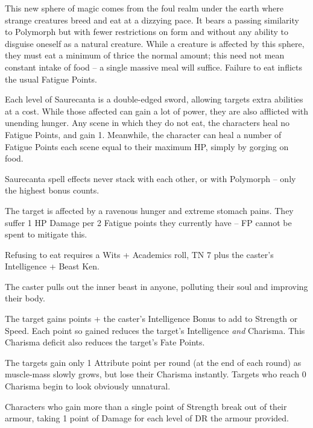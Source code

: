 \begin{multicols}{2}

\noindent
This new sphere of magic comes from the foul realm under the earth where strange creatures breed and eat at a dizzying pace.
It bears a passing similarity to Polymorph but with fewer restrictions on form and without any ability to disguise oneself as a natural creature.
While a creature is affected by this sphere, they must eat a minimum of thrice the normal amount; this need not mean constant intake of food -- a single massive meal will suffice.
Failure to eat inflicts the usual Fatigue Points.

Each level of Saurecanta is a double-edged sword, allowing targets extra abilities at a cost.
While those affected can gain a lot of power, they are also afflicted with unending hunger.
Any scene in which they do not eat, the characters heal no Fatigue Points, and gain 1.
Meanwhile, the character can heal a number of Fatigue Points each scene equal to their maximum HP, simply by gorging on food.

Saurecanta spell effects never stack with each other, or with Polymorph -- only the highest bonus counts.

\spelllevel \label{saurecantaone}
The target is affected by a ravenous hunger and extreme stomach pains.
They suffer 1 HP Damage per 2 Fatigue points they currently have -- FP cannot be spent to mitigate this.

Refusing to eat requires a Wits + Academics roll, TN 7 plus the caster's Intelligence + Beast Ken.

\spelllevel
{}
The caster pulls out the inner beast in anyone, polluting their soul and improving their body.

The target gains  points + the caster's Intelligence Bonus to add to Strength or Speed.
Each point so gained reduces the target's Intelligence \emph{and} Charisma.
This Charisma deficit also reduces the target's Fate Points.

The targets gain only 1 Attribute point per round (at the end of each round) as muscle-mass slowly grows, but lose their Charisma instantly.
Targets who reach 0 Charisma begin to look obviously unnatural.

Characters who gain more than a single point of Strength break out of their armour, taking 1 point of Damage for each level of DR the armour provided.


\end{multicols}
